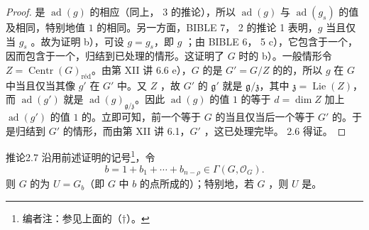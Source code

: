 \begin{proof}
是 $\operatorname{ad}(g)$ 的相应（同上， 3 的推论），所以 $\operatorname{ad}(g)$ 与 $\operatorname{ad}(g_s)$ 的值及相同，特别地值 $1$ 的相同。另一方面，BIBLE 7， 2 的推论 1 表明，$g$ 当且仅当 $g_s$ 。故为证明 b），可设 $g=g_s$，即 $g$ ；由 BIBLE 6， 5 c），它包含于一个，因而包含于一个，归结到已处理的情形。这证明了 $G$ 时的 b）。一般情形令 $Z=\operatorname{Centr}(G)_{\mathrm{r\text{é}d}}$。由第 XII 讲 6.6 e），$G$ 的是 $G'=G/Z$ 的的，所以 $g$ 在 $G$ 中当且仅当其像 $g'$ 在 $G'$ 中。又 $Z$ ，故 $G'$ 的 $\mathfrak g'$ 就是 $\mathfrak g/\mathfrak z$，其中 $\mathfrak z=\operatorname{Lie}(Z)$，而 $\operatorname{ad}(g')$ 就是 $\operatorname{ad}(g)_{\mathfrak g/\mathfrak z}$。因此 $\operatorname{ad}(g)$ 的值 $1$ 的等于 $d=\dim Z$ 加上 $\operatorname{ad}(g')$ 的值 $1$ 的。立即可知，前一个等于 $G$ 的当且仅当后一个等于 $G'$ 的。于是归结到 $G'$ 的情形，而由第 XII 讲 6.1，$G'$ ，这已处理完毕。 2.6 得证。
\end{proof}
\begin{SGAresult}{推论}{2.7}
沿用前述证明的记号\footnote{编者注：参见上面的（$\dagger$）。}，令
\[b=1+b_1+\cdots+b_{n-\rho}\in\Gamma(G,\mathscr O_G).\]
则 $G$ 的为 $U=G_b$（即 $G$ 中 $b$ 的点所成的）；特别地，若 $G$ ，则 $U$ 是。
\end{SGAresult}
